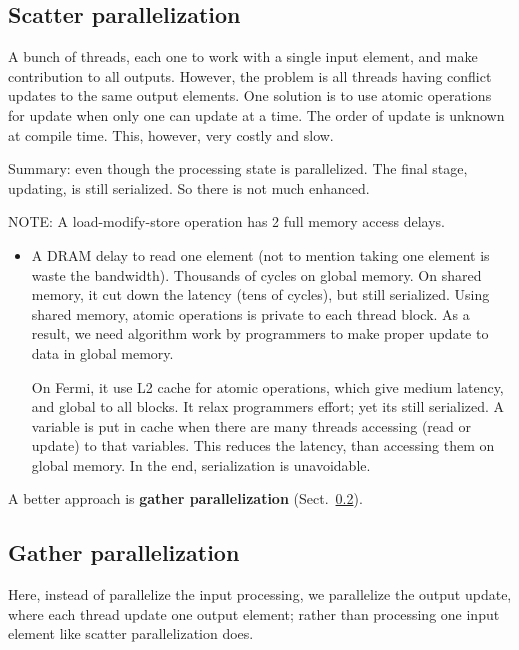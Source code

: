 

\subsection{Scatter parallelization}
\label{sec:scatt-parall}

A bunch of threads, each one to work with a single input element, and
make contribution to all outputs. However, the problem is all threads
having conflict updates to the same output elements. One solution is
to use atomic operations for update when only one can update at a
time. The order of update is unknown at compile time. This, however,
very costly and slow.

Summary: even though the processing state is parallelized. The final
stage, updating, is still serialized. So there is not much enhanced.

NOTE: A load-modify-store operation has 2 full memory access delays.
\begin{itemize}
\item A DRAM delay to read one element (not to mention taking one
  element is waste the bandwidth). Thousands of cycles on global
  memory. On shared memory, it cut down the latency (tens of cycles),
  but still serialized. Using shared memory, atomic operations is
  private to each thread block. As a result, we need algorithm work by
  programmers to make proper update to data in global memory.

  On Fermi, it use L2 cache for atomic operations, which give medium
  latency, and global to all blocks. It relax programmers effort; yet
  its still serialized. A variable is put in cache when there are many
  threads accessing (read or update) to that variables. This reduces
  the latency, than accessing them on global memory. In the end,
  serialization is unavoidable. 
\end{itemize}

A better approach is {\bf gather parallelization}
(Sect.~\ref{sec:gath-parall}).

\subsection{Gather parallelization}
\label{sec:gath-parall}

Here, instead of parallelize the input processing, we parallelize the
output update, where each thread update one output element; rather
than processing one input element like scatter parallelization does. 

